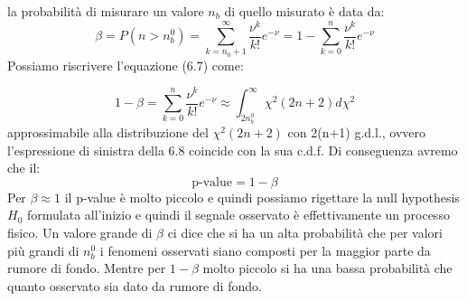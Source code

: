 \documentclass[11pt,a4paper]{book}
\begin{document}
\noindent la probabilit\`{a} di misurare un valore $n_b$ di quello misurato \`{e} data da:
\begin{equation}
	\beta = P(n > n_b^{0}) = \sum_{k =n_0+1}^{\infty}\dfrac{\nu^k}{k!}e^{-\nu} = 1- \sum_{k =0}^{n}\dfrac{\nu^k}{k!}e^{-\nu}  	
\end{equation}
Possiamo riscrivere l'equazione (6.7) come:

\begin{equation}
	1-\beta = \sum_{k =0}^{n}\dfrac{\nu^k}{k!}e^{-\nu} \approx \int_{2n_{b}^0}^{\infty}\chi^2(2n+2)d\chi^2
\end{equation} 
\newline
approssimabile alla distribuzione del $\chi^2(2n+2)$ con 2(n+1) g.d.l., ovvero l'espressione di sinistra della 6.8 coincide con la sua c.d.f. Di conseguenza avremo che il:
\begin{equation*}
	\text{p-value} = 1- \beta
\end{equation*}
Per $\beta \approx 1$ il p-value \`{e} molto piccolo e quindi possiamo rigettare la null hypothesis $H_0$ formulata all'inizio e quindi il segnale osservato \`{e} effettivamente un processo fisico. Un valore grande di $\beta$ ci dice che si ha un alta probabilit\`{a} che per valori pi\`{u} grandi di $n_b^0$ i fenomeni osservati siano composti per la maggior parte da rumore di fondo. Mentre per $1-\beta$ molto piccolo si ha una bassa probabilit\`{a} che quanto osservato sia dato da rumore di fondo.
\end{document}
